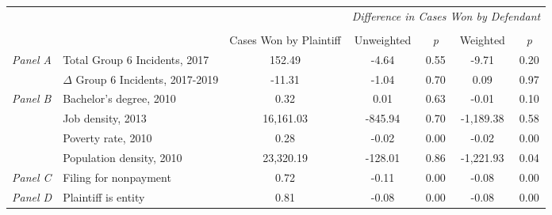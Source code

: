 \begin{tabular}{llccccc}
\toprule
 &  & \textit{} & \multicolumn{4}{c}{\textit{Difference in Cases Won by Defendant}} \\
\cline{4-7}
\\
 &  & Cases Won by Plaintiff & Unweighted & \emph{p} & Weighted & \emph{p} \\
\midrule
\multirow[c]{2}{.75cm}{\textit{Panel A}} & Total Group 6 Incidents, 2017 & 152.49 & -4.64 & 0.55 & -9.71 & 0.20 \\
 & $\Delta$ Group 6 Incidents, 2017-2019 & -11.31 & -1.04 & 0.70 & 0.09 & 0.97 \\
\cline{1-7}
\multirow[c]{4}{.75cm}{\textit{Panel B}} & Bachelor's degree, 2010 & 0.32 & 0.01 & 0.63 & -0.01 & 0.10 \\
 & Job density, 2013 & 16,161.03 & -845.94 & 0.70 & -1,189.38 & 0.58 \\
 & Poverty rate, 2010 & 0.28 & -0.02 & 0.00 & -0.02 & 0.00 \\
 & Population density, 2010 & 23,320.19 & -128.01 & 0.86 & -1,221.93 & 0.04 \\
\cline{1-7}
\textit{Panel C} & Filing for nonpayment & 0.72 & -0.11 & 0.00 & -0.08 & 0.00 \\
\cline{1-7}
\textit{Panel D} & Plaintiff is entity & 0.81 & -0.08 & 0.00 & -0.08 & 0.00 \\
\cline{1-7}
\bottomrule
\end{tabular}
